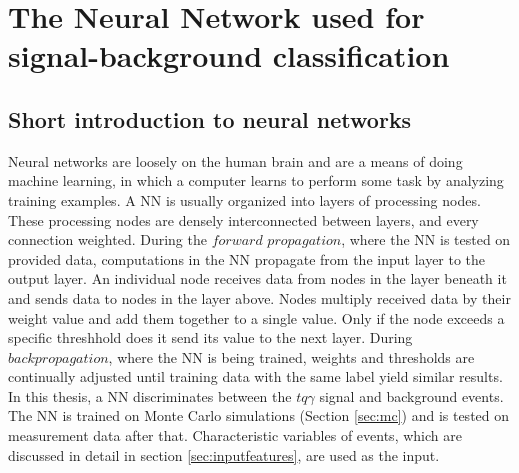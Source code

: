 \chapter{The Neural Network used for signal-background classification}
\section{Short introduction to neural networks}
Neural networks are loosely on the human brain and are a means of doing machine learning, in which a computer learns to perform some task by analyzing training examples. 
A NN is usually organized into layers of processing nodes. These processing nodes are densely interconnected between layers, and every connection weighted. 
During the $forward$ $propagation$, where the NN is tested on provided data, computations in the NN propagate from the input layer to the output layer. An individual node receives data from nodes in the layer beneath it and sends data to nodes in the layer above. 
Nodes multiply received data by their weight value and add them together to a single value. Only if the node exceeds a specific threshhold does it send its value to the next layer. During $backpropagation$, where the NN is being trained, weights and thresholds are continually adjusted until training data with the same label yield similar results.   
In this thesis, a NN discriminates between the $tq\gamma$ signal and background events. 
The NN is trained on Monte Carlo simulations (Section \ref{sec:mc}) and is tested on measurement data after that. Characteristic variables of events, which are discussed in detail in section \ref{sec:inputfeatures}, are used as the input. 
